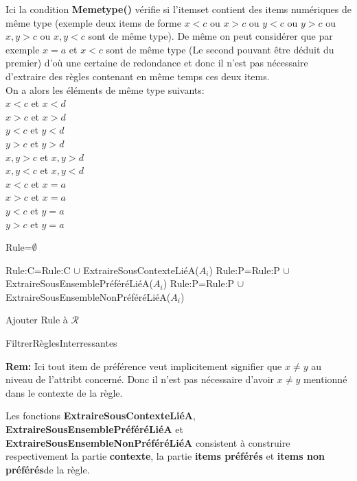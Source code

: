 \documentclass[a4paper]{article}
\begin{document}
Ici la condition \textbf{Memetype()} vérifie si l'itemset contient des items numériques de même type (exemple deux items de forme $x<c$ ou $x>c$ ou $y<c$ ou $y>c$ ou $x,y>c$ ou $x,y<c$  sont de même type). De même on peut considérer que par exemple $x=a$ et $x<c$ sont de même type (Le second pouvant être déduit du premier) d'où une certaine de redondance et donc il n'est pas nécessaire d'extraire des règles contenant en même temps ces deux items. \\
On a alors les éléments de même type suivants:\\
$x<c$ et $x<d$\\
$x>c$ et $x>d$\\
$y<c$ et $y<d$ \\
$y>c$ et $y>d$\\
$x,y>c$ et $x,y>d$\\
$x,y<c$ et $x,y<d$\\
$x<c$ et $x=a$\\
$x>c$ et $x=a$\\
$y<c$ et $y=a$ \\
$y>c$ et $y=a$\\



\begin{algorithm}[H]
	
	\Deb
	{
		{
			Rule=$\emptyset$\;
			{
									
				Rule:C=Rule:C $\cup$ ExtraireSousContexteLiéA($A_{i}$)\;
				Rule:P=Rule:P $\cup $ExtraireSousEnsemblePréféréLiéA($A_{i}$)\;
				Rule:P=Rule:P $\cup $ExtraireSousEnsembleNonPréféréLiéA($A_{i}$)\;
			}
			
			{
				Ajouter Rule à $\mathcal{R}$
			}  
		
		}
		
	}
	
\caption{FiltrerRèglesInterressantes}
\end{algorithm}
\textbf{Rem:} Ici tout item de préférence veut implicitement signifier que $x\neq y$ au niveau de l'attribt concerné. Donc il n'est pas nécessaire d'avoir $x\neq y$ mentionné dans le contexte de la règle.

Les fonctions \textbf{ExtraireSousContexteLiéA}, \textbf{ExtraireSousEnsemblePréféréLiéA} et \textbf{ExtraireSousEnsembleNonPréféréLiéA} consistent à construire respectivement la partie \textbf{contexte}, la partie \textbf{items préférés} et \textbf{items non préférés}de la règle.\\
\end{document}
